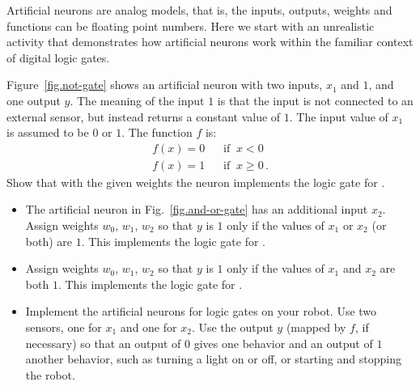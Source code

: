 Artificial neurons are analog models, that is, the inputs, outputs, weights and functions can be floating point numbers. Here we start with an unrealistic activity that demonstrates how artificial neurons work within the familiar context of digital logic gates.

Figure~\ref{fig.not-gate} shows an artificial neuron with two inputs, $x_1$ and $1$, and one output $y$. The meaning of the input $1$ is that the input is not connected to an external sensor, but instead returns a constant value of $1$. The input value of $x_1$ is assumed to be $0$ or $1$. The function $f$ is:
\[
\begin{array}{ll}
f(x) = 0 & \;\;\;\textrm{if} \;\; x < 0\\
f(x) = 1 & \;\;\;\textrm{if} \;\; x \geq 0\,.
\end{array}
\]
Show that with the given weights the neuron implements the logic gate for .

\begin{framed}
\begin{itemize}
\item The artificial neuron in Fig.~\ref{fig.and-or-gate} has an additional input $x_2$. Assign weights $w_0$, $w_1$, $w_2$ so that $y$ is $1$ only if the values of $x_1$ or $x_2$ (or both) are $1$. This implements the logic gate for  .
\item Assign weights $w_0$, $w_1$, $w_2$ so that $y$ is $1$ only if the values of $x_1$ and $x_2$ are both $1$. This implements the logic gate for .
\item Implement the artificial neurons for logic gates on your robot. Use two sensors, one for $x_1$ and one for $x_2$. Use the output $y$ (mapped by $f$, if necessary) so that an output of $0$ gives one behavior and an output of $1$ another behavior, such as turning a light on or off, or starting and stopping the robot.
\end{itemize}
\end{framed}

